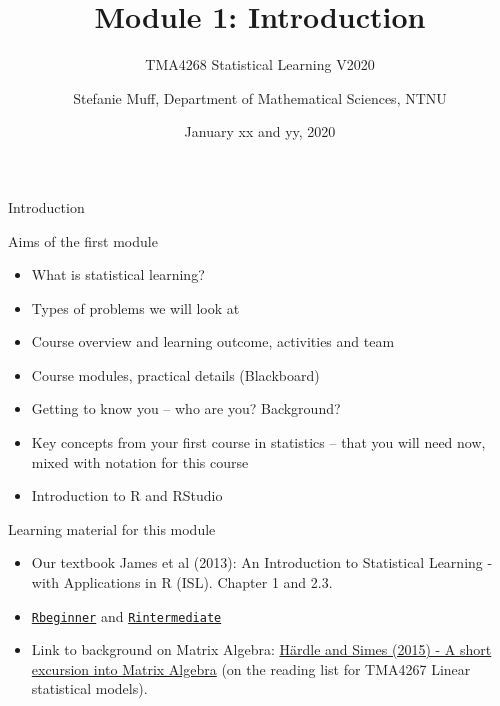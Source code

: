 \documentclass[ignorenonframetext,]{beamer}
\title{Module 1: Introduction}
\subtitle{TMA4268 Statistical Learning V2020}
\author{Stefanie Muff, Department of Mathematical Sciences, NTNU}
\date{January xx and yy, 2020}
\begin{document}
\frame{\titlepage}

\begin{frame}{Introduction}

\begin{block}{Aims of the first module}

\begin{itemize}
\item
  What is statistical learning?
\item
  Types of problems we will look at
\item
  Course overview and learning outcome, activities and team
\item
  Course modules, practical details (Blackboard)
\item
  Getting to know you -- who are you? Background?
\item
  Key concepts from your first course in statistics -- that you will
  need now, mixed with notation for this course
\item
  Introduction to R and RStudio\\
\end{itemize}

\end{block}

\end{frame}

\begin{frame}

\begin{block}{Learning material for this module}

\begin{itemize}
\item
  Our textbook James et al (2013): An Introduction to Statistical
  Learning - with Applications in R (ISL). Chapter 1 and 2.3.
\item
  \href{https://www.math.ntnu.no/emner/TMA4268/2019v/1Intro/Rbeginner.html}{\texttt{Rbeginner}}
  and
  \href{https://www.math.ntnu.no/emner/TMA4268/2019v/1Intro/Rintermediate.html}{\texttt{Rintermediate}}
\item
  Link to background on Matrix Algebra:
  \href{https://link.springer.com/chapter/10.1007/978-3-662-45171-7_2}{Härdle
  and Simes (2015) - A short excursion into Matrix Algebra} (on the
  reading list for TMA4267 Linear statistical models).
\end{itemize}

\end{block}

\end{frame}
\end{document}
